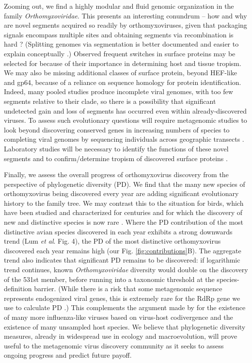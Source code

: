 \documentclass[11pt,twocolumn]{article}
\begin{document}
Zooming out, we find a highly modular and fluid genomic organization in the family \textit{Orthomyxoviridae}. This presents an interesting conundrum -- how and why are novel segments acquired so readily by orthomyxoviruses, given that packaging signals encompass multiple sites \citep{baker_influenza_2014} and obtaining segments via recombination is hard \citep{chare_phylogenetic_2003}? (Splitting genomes via segmentation is better documented \citep{kondo_orchid_2006,qin_tick-borne_2014} and easier to explain conceptually \citep{ke_phylodynamic_2013}.) Observed frequent switches in surface proteins may be selected for because of their importance in determining host and tissue tropism. We may also be missing additional classes of surface protein, beyond HEF-like and gp64, because of a reliance on sequence homology for protein identification. Indeed, many pooled studies produce incomplete viral genomes, with too few segments relative to their clade, so there is a possibility that significant undetected gain and loss of segments has occurred even within already-discovered viruses. To assess such evolutionary questions will require metagenomic studies to look beyond discovering conserved genes in increasing numbers of species to completing viral genomes by sequencing individuals across geographic transects \citep{batson_single_2021}. Laboratory studies will be necessary to identify the functions of these novel segments and to confirm/determine tropism of discovered surface proteins \citep{arunkumar_functionality_2021}.

Finally, we assess the overall progress of orthomyxovirus discovery from the perspective of phylogenetic diversity (PD). We find that the many new species of orthomyxovirus being discovered every year are adding significant evolutionary history to the family tree. We may contrast this to the situation for birds, which have been studied and characterized for centuries and for which the discovery of new and distinctive species is now rare \citep{lum_tracking_2022}. Where the PD contribution of the most distinctive avian species discovered in each year exhibits a strong downwards trend (Lum \textit{et al}.\citep{lum_tracking_2022} Fig. 4), the PD of the most distinctive orthomyxovirus discovered each year remains high (our Fig. \ref{fig:contributions}B). The aggregate trend also indicates that significant PD remains to be discovered: if logarithmic trend continues, known \textit{Orthomyxoviridae} diversity would double on the discovery of the 531st member, before running into a taxonomic threshold at the species-definition barrier. (While there is a risk that some metagenomic sequence represents endogenized viral genes, this is extremely rare for the RdRp gene we use to calculate PD \citep{whitfield_diversity_2017}.)
This complements the argument made by \cite{parry_divergent_2020} for the existence of many more influenza-like viruses based on virus-host codivergence and the existence of many unsampled host species.
We believe that phylogenetic diversity measures, already in widespread use in ecology and macroevolution, will prove useful to the metagenomic virus discovery community as it seeks to assess ongoing progress and predict future payoff.
\end{document}
